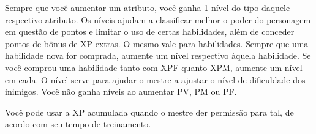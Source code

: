

Sempre que você aumentar um atributo, você ganha 1 nível do tipo daquele respectivo atributo. Os níveis ajudam a classificar melhor o poder do personagem em questão de pontos e limitar o uso de certas habilidades, além de conceder pontos de bônus de XP extras. O mesmo vale para habilidades. Sempre que uma habilidade nova for comprada, aumente um nível respectivo àquela habilidade. Se você comprou uma habilidade tanto com XPF quanto XPM, aumente um nível em cada. O nível serve para ajudar o mestre a ajustar o nível de dificuldade dos inimigos. Você não ganha níveis ao aumentar PV, PM ou PF.

Você pode usar a XP acumulada quando o mestre der permissão para tal, de acordo com seu tempo de treinamento. 





